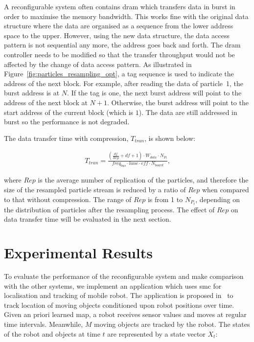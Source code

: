 A reconfigurable system often contains \gls{dram} which transfers data in burst in order to maximise the memory bandwidth.
This works fine with the original data structure where the data are organised as a sequence from the lower address space to the upper.
However, using the new data structure, the data access pattern is not sequential any more, the address goes back and forth.
The \gls{dram} controller needs to be modified so that the transfer throughput would not be affected by the change of data access pattern.
As illustrated in Figure~\ref{fig:particles_resampling_opt}, a tag sequence is used to indicate the address of the next block.
For example, after reading the data of particle~1, the burst address is at $N$.
If the tag is one, the next burst address will point to the address of the next block at $N+1$.
Otherwise, the burst address will point to the start address of the current block (which is $1$).
The data are still addressed in burst so the performance is not degraded.

The data transfer time with compression, $T_{tran}$, is shown below:

\begin{equation}
\begin{aligned}
T_{tran} = \frac{(\frac{df}{Rep} + df + 1) \cdot W_{data} \cdot {N_{P_t}}}{freq_{bus} \cdot lane \cdot eff \cdot N_{board}} \mbox{,}
\end{aligned}
\label{eqt:data_opt}
\end{equation}

where $Rep$ is the average number of replication of the particles,
and therefore the size of the resampled particle stream is reduced by a ratio of $Rep$ when compared to that without compression.
The range of $Rep$ is from 1 to $N_{P_t}$, depending on the distribution of particles after the resampling process.
The effect of $Rep$ on data transfer time will be evaluated in the next section.

\section{Experimental Results}
\label{sec:reconfig_results}

To evaluate the performance of the reconfigurable system and make comparison with the other systems, 
we implement an application which uses \gls{smc} for localisation and tracking of mobile robot.
The application is proposed in~\cite{montemerlo02} to track location of moving objects conditioned upon robot positions over time.
Given an priori learned map, a robot receives sensor values and moves at regular time intervals. 
Meanwhile, $M$ moving objects are tracked by the robot.
The states of the robot and objects at time $t$ are represented by a state vector $X_t$:
 
